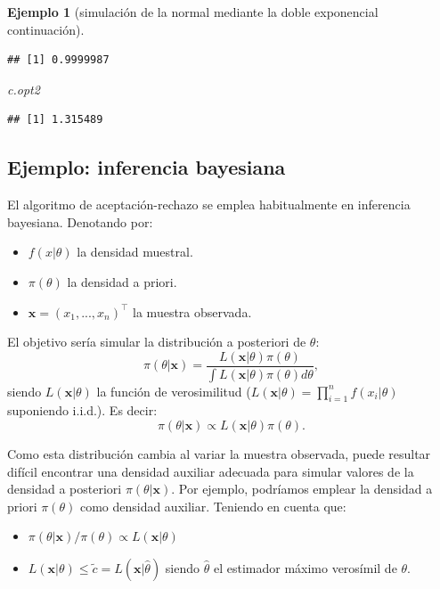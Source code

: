 \documentclass[
]{book}
\newenvironment{Shaded}{\begin{snugshade}}{\end{snugshade}}
\newcommand{\NormalTok}[1]{#1}
\theoremstyle{break}
\newtheorem{example}{Ejemplo}[chapter]
\theoremstyle{nonumberplain}
\begin{document}
\begin{example}[simulación de la normal mediante la doble exponencial continuación]
\begin{verbatim}
## [1] 0.9999987
\end{verbatim}

\begin{Shaded}
\begin{Highlighting}[]
\NormalTok{c.opt2}
\end{Highlighting}
\end{Shaded}

\begin{verbatim}
## [1] 1.315489
\end{verbatim}

\end{example}

\hypertarget{bayes-ar}{%
\subsection{Ejemplo: inferencia bayesiana}\label{bayes-ar}}

El algoritmo de aceptación-rechazo se emplea habitualmente en inferencia bayesiana.
Denotando por:

\begin{itemize}
\item
  \(f(x|\theta)\) la densidad muestral.
\item
  \(\pi(\theta)\) la densidad a priori.
\item
  \(\mathbf{x}=(x_1,...,x_n)^{\top}\) la muestra observada.
\end{itemize}

El objetivo sería simular la distribución a posteriori de \(\theta\):
\[\pi(\theta|\mathbf{x}) = \frac{L(\mathbf{x}|\theta)\pi(\theta)}{\int L(\mathbf{x}|\theta)\pi(\theta)d\theta},\]
siendo \(L(\mathbf{x}|\theta)\) la función de verosimilitud (\(L(\mathbf{x}|\theta) = \prod\limits_{i=1}^{n}f(x_i|\theta)\) suponiendo i.i.d.).
Es decir:
\[\pi(\theta | \mathbf{x}) \propto L(\mathbf{x}| \theta)\pi(\theta).\]

Como esta distribución cambia al variar la muestra observada, puede resultar difícil encontrar una densidad auxiliar adecuada para simular valores de la densidad a posteriori \(\pi(\theta|\mathbf{x})\).
Por ejemplo, podríamos emplear la densidad a priori \(\pi(\theta)\) como densidad auxiliar.
Teniendo en cuenta que:

\begin{itemize}
\item
  \(\pi(\theta |\mathbf{x})/\pi(\theta)\propto L(\mathbf{x}|\theta)\)
\item
  \(L(\mathbf{x}|\theta)\leq \tilde{c}=L(\mathbf{x}|\hat{\theta})\) siendo
  \(\hat{\theta}\) el estimador máximo verosímil de \(\theta\).
\end{itemize}
\end{document}
